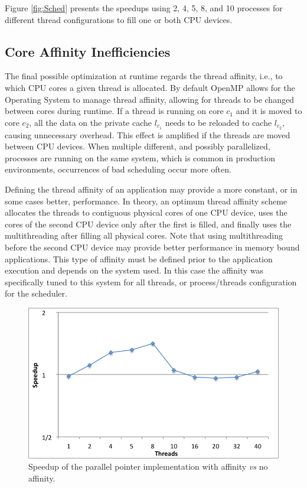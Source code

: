 Figure \ref{fig:Sched} presents the speedups using 2, 4, 5, 8, and 10 processes for different thread configurations to fill one or both CPU devices.

\subsection{Core Affinity Inefficiencies}

The final possible optimization at runtime regards the thread affinity, i.e., to which CPU cores a given thread is allocated. By default OpenMP allows for the Operating System to manage thread affinity, allowing for threads to be changed between cores during runtime. If a thread is running on core $c_1$ and it is moved to core $c_2$, all the data on the private cache $l_{c_1}$ needs to be reloaded to cache $l_{c_2}$, causing unnecessary overhead. This effect is amplified if the threads are moved between CPU devices. When multiple different, and possibly parallelized, processes are running on the same system, which is common in production environments, occurrences of bad scheduling occur more often.

Defining the thread affinity of an application may provide a more constant, or in some cases better, performance. In theory, an optimum thread affinity scheme allocates the threads to contiguous physical cores of one CPU device, uses the cores of the second CPU device only after the first is filled, and finally uses the multithreading after filling all physical cores. Note that using multithreading before the second CPU device may provide better performance in memory bound applications. This type of affinity must be defined prior to the application execution and depends on the system used. In this case the affinity was specifically tuned to this system for all threads, or process/threads configuration for the scheduler.

\begin{figure}[!htp]
	\begin{center}
		\includegraphics[scale=0.4]{charts/speedup_pointer_aff.png}
		\caption{Speedup of the \tth parallel pointer implementation with affinity \textit{vs} no affinity.}
		\label{fig:pointer_aff}
	\end{center}
\end{figure}

